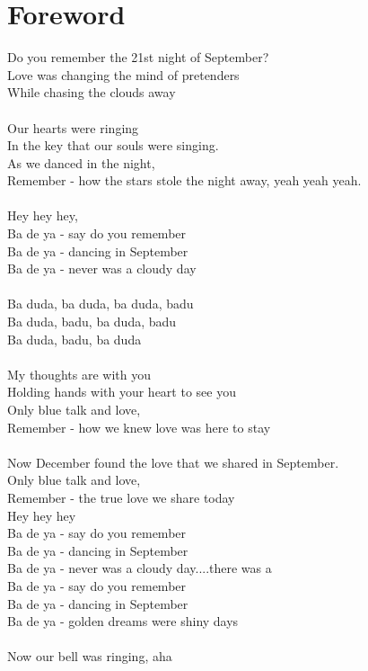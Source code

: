 \documentclass{42}
\begin{document}
\chapter{Foreword}
{
\small
\noindent
Do you remember the 21st night of September?\\
Love was changing the mind of pretenders\\
While chasing the clouds away\\
\\
Our hearts were ringing\\
In the key that our souls were singing.\\
As we danced in the night,\\
Remember - how the stars stole the night away, yeah yeah yeah.\\
\\
Hey hey hey,\\
Ba de ya - say do you remember\\
Ba de ya - dancing in September\\
Ba de ya - never was a cloudy day\\
\\
Ba duda, ba duda, ba duda, badu\\
Ba duda, badu, ba duda, badu\\
Ba duda, badu, ba duda\\
\\
My thoughts are with you\\
Holding hands with your heart to see you\\
Only blue talk and love,\\
Remember - how we knew love was here to stay\\
\\
Now December found the love that we shared in September.\\
Only blue talk and love,\\
Remember - the true love we share today\\
Hey hey hey\\
Ba de ya - say do you remember\\
Ba de ya - dancing in September\\
Ba de ya - never was a cloudy day....there was a\\
Ba de ya - say do you remember\\
Ba de ya - dancing in September\\
Ba de ya - golden dreams were shiny days\\
\\
Now our bell was ringing, aha\\
}
\end{document}
